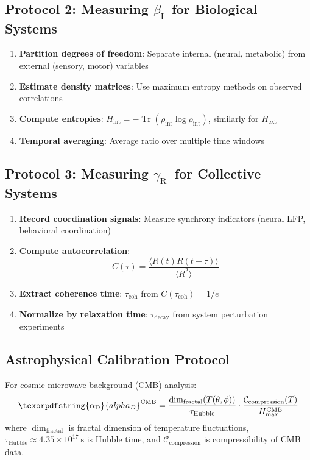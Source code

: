 \documentclass[12pt,a4paper]{article}
\DeclareMathOperator{\Tr}{Tr}
\DeclareRobustCommand{\alD}{\texorpdfstring{\ensuremath{\alpha_{\mathrm{D}}}}{alpha_D}}
\DeclareRobustCommand{\beI}{\texorpdfstring{\ensuremath{\beta_{\mathrm{I}}}}{beta_I}}
\DeclareRobustCommand{\gaR}{\texorpdfstring{\ensuremath{\gamma_{\mathrm{R}}}}{gamma_R}}
\begin{document}
	\subsection{Protocol 2: Measuring \beI\ for Biological Systems}
	
	\begin{enumerate}
		\item \textbf{Partition degrees of freedom}: Separate internal (neural, metabolic) from external (sensory, motor) variables
		\item \textbf{Estimate density matrices}: Use maximum entropy methods on observed correlations
		\item \textbf{Compute entropies}: \(H_{\mathrm{int}} = -\Tr(\rho_{\mathrm{int}}\log\rho_{\mathrm{int}})\), similarly for \(H_{\mathrm{ext}}\)
		\item \textbf{Temporal averaging}: Average ratio over multiple time windows
	\end{enumerate}
	
	\subsection{Protocol 3: Measuring \gaR\ for Collective Systems}
	
	\begin{enumerate}
		\item \textbf{Record coordination signals}: Measure synchrony indicators (neural LFP, behavioral coordination)
		\item \textbf{Compute autocorrelation}:
		\[
		C(\tau) = \frac{\langle R(t)R(t+\tau)\rangle}{\langle R^2\rangle}
		\]
		\item \textbf{Extract coherence time}: \(\tau_{\mathrm{coh}}\) from \(C(\tau_{\mathrm{coh}}) = 1/e\)
		\item \textbf{Normalize by relaxation time}: \(\tau_{\mathrm{decay}}\) from system perturbation experiments
	\end{enumerate}
	
	\subsection{Astrophysical Calibration Protocol}
	\label{subsec:astro-calibration}
	
	For cosmic microwave background (CMB) analysis:
	\[
	\alD^{\mathrm{CMB}} = \frac{\dim_{\mathrm{fractal}}(T(\theta,\phi))}{\tau_{\mathrm{Hubble}}} \cdot \frac{\mathcal{C}_{\mathrm{compression}}(T)}{H_{\max}^{\mathrm{CMB}}}
	\]
	where \(\dim_{\mathrm{fractal}}\) is fractal dimension of temperature fluctuations, \(\tau_{\mathrm{Hubble}} \approx 4.35 \times 10^{17}\ \mathrm{s}\) is Hubble time, and \(\mathcal{C}_{\mathrm{compression}}\) is compressibility of CMB data.
	
\end{document}
